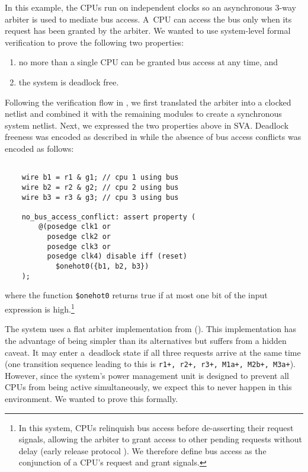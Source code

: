 In this example, the CPUs run on independent clocks so an asynchronous 3-way
arbiter is used to mediate bus access. A~CPU can access the bus only when its
request has been granted by the arbiter. We wanted to use system-level formal
verification to prove the following two properties:

\begin{enumerate}
	\item no more than a single CPU can be granted bus access at any time, and
	\item the system is deadlock free.
\end{enumerate}

Following the verification flow in , we first translated
the arbiter into a clocked netlist and combined it with the remaining modules
to create a synchronous system netlist. Next, we expressed the two properties
above in SVA. Deadlock freeness was encoded as described in
 while the absence of bus access conflicts was
encoded as follows:

\vspace{0.2cm}

\begin{tcolorbox}[frame hidden,interior hidden,boxsep=0pt,boxrule=1pt]
	\footnotesize
	\begin{verbatim}

	wire b1 = r1 & g1; // cpu 1 using bus
	wire b2 = r2 & g2; // cpu 2 using bus
	wire b3 = r3 & g3; // cpu 3 using bus

	no_bus_access_conflict: assert property (
	    @(posedge clk1 or
	      posedge clk2 or
	      posedge clk3 or
	      posedge clk4) disable iff (reset)
	        $onehot0({b1, b2, b3})
	);
	\end{verbatim}
\end{tcolorbox}

\newcommand{\fulla}{\texttt{full}}
\newcommand{\flata}{\texttt{flat}}

where the function \texttt{\$onehot0} returns true if at most one bit of the
input expression is high.\footnote{In this system, CPUs relinquish bus access
before de-asserting their request signals, allowing the arbiter to grant
access to other pending requests without delay (early release protocol
\cite{mokhov2011flat}). We therefore define bus access as the conjunction of a
CPU's request and grant signals.}

The system uses a flat arbiter implementation from \cite{mokhov2011flat}
(). This implementation has the advantage of being simpler
than its alternatives but suffers from a hidden caveat. It may enter
a~deadlock state if all three requests arrive at the same time (one transition
sequence leading to this is \texttt{r1+, r2+, r3+, M1a+, M2b+, M3a+}).
However, since the system's power management unit is designed to prevent all
CPUs from being active simultaneously, we expect this to never happen in this
environment. We wanted to prove this formally.


